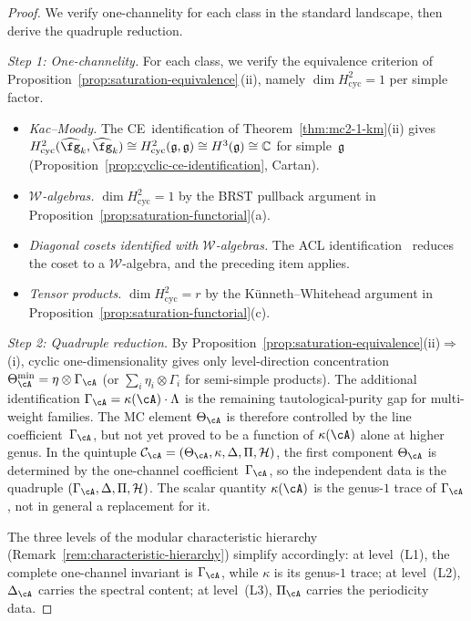 \begin{proof}
We verify one-channelity for each class in the standard
landscape, then derive the quadruple reduction.

\emph{Step 1: One-channelity.}
For each class, we verify the equivalence
criterion of Proposition~\ref{prop:saturation-equivalence}\,(ii),
namely $\dim H^2_{\mathrm{cyc}} = 1$ per simple factor.
\begin{itemize}
\item \emph{Kac--Moody.}
  The CE~identification of
  Theorem~\ref{thm:mc2-1-km}(ii) gives
  $H^2_{\mathrm{cyc}}(\widehat{\fg}_k, \widehat{\fg}_k)
  \cong H^2_{\mathrm{cyc}}(\mathfrak{g},\mathfrak{g})
  \cong H^3(\mathfrak{g}) \cong \mathbb{C}$ for
  simple~$\mathfrak{g}$
  (Proposition~\ref{prop:cyclic-ce-identification},
  Cartan).
\item \emph{$\mathcal{W}$-algebras.}
  $\dim H^2_{\mathrm{cyc}} = 1$ by the BRST pullback
  argument in
  Proposition~\ref{prop:saturation-functorial}(a).
\item \emph{Diagonal cosets identified with
  $\mathcal{W}$-algebras.}
  The ACL identification~\cite{ACL19} reduces the coset to a
  $\mathcal{W}$-algebra, and the preceding item applies.
\item \emph{Tensor products.}
  $\dim H^2_{\mathrm{cyc}} = r$ by the K\"unneth--Whitehead
  argument in
  Proposition~\ref{prop:saturation-functorial}(c).
\end{itemize}

\emph{Step 2: Quadruple reduction.}
By Proposition~\ref{prop:saturation-equivalence}(ii)$\Rightarrow$(i),
cyclic one-dimensionality gives only level-direction concentration
$\Theta^{\min}_{\cA} = \eta \otimes \Gamma_{\cA}$
\textup{(}or $\sum_i \eta_i \otimes \Gamma_i$ for
semi-simple products\textup{)}.  The additional identification
$\Gamma_{\cA} = \kappa(\cA) \cdot \Lambda$ is the remaining
tautological-purity gap for multi-weight families.
The MC element $\Theta_{\cA}$ is therefore controlled by the
line coefficient~$\Gamma_{\cA}$, but not yet proved to be a
function of $\kappa(\cA)$ alone at higher genus.
In the quintuple
$\mathcal{C}_{\cA} = (\Theta_{\cA}, \kappa, \Delta, \Pi,
\mathcal{H})$, the first component $\Theta_{\cA}$ is
determined by the one-channel coefficient~$\Gamma_{\cA}$, so the
independent data is the quadruple
$(\Gamma_{\cA}, \Delta, \Pi, \mathcal{H})$.
The scalar quantity $\kappa(\cA)$ is the genus-$1$ trace of
$\Gamma_{\cA}$, not in general a replacement for it.

The three levels of the modular characteristic hierarchy
(Remark~\ref{rem:characteristic-hierarchy}) simplify
accordingly:
at level~(L1), the complete one-channel invariant is
$\Gamma_{\cA}$, while $\kappa$ is its genus-$1$ trace;
at level~(L2), $\Delta_{\cA}$ carries the spectral content;
at level~(L3), $\Pi_{\cA}$ carries the periodicity data.
\end{proof}

